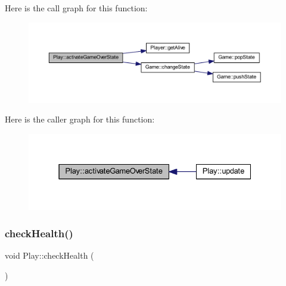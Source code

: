 Here is the call graph for this function\+:
\nopagebreak
\begin{figure}[H]
\begin{center}
\leavevmode
\includegraphics[width=350pt]{class_play_ab99107a51dbbc3b2f5ef9a9549944574_cgraph}
\end{center}
\end{figure}
Here is the caller graph for this function\+:
\nopagebreak
\begin{figure}[H]
\begin{center}
\leavevmode
\includegraphics[width=331pt]{class_play_ab99107a51dbbc3b2f5ef9a9549944574_icgraph}
\end{center}
\end{figure}
\mbox{\label{class_play_a75c96673011616e5c97731870ddb649e}} 
\subsubsection{\texorpdfstring{check\+Health()}{checkHealth()}}
{\footnotesize\ttfamily void Play\+::check\+Health (\begin{DoxyParamCaption}{ }\end{DoxyParamCaption})}

